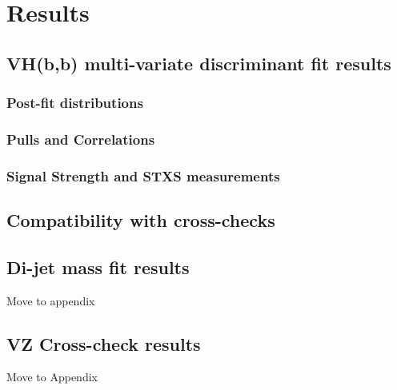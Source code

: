 \chapter{Results}%
\label{ch:results}
\section{VH(b,b) multi-variate discriminant fit results}%
\label{sec:mva-results}
\subsection{Post-fit distributions}







\subsection{Pulls and Correlations}

\subsection{Signal Strength and STXS measurements}

\section{Compatibility with cross-checks}

\section{Di-jet mass fit results}%
\label{sec:mbb-results}
Move to appendix
\section{VZ Cross-check results}%
\label{sec:VZ-results}
Move to Appendix

